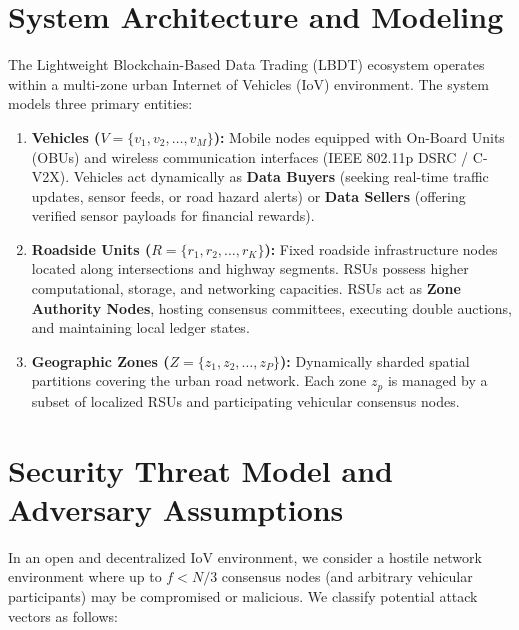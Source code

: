 \section{System Architecture and Modeling}\label{sec:problem_system_model}
\noindent The Lightweight Blockchain-Based Data Trading (LBDT) ecosystem operates within a multi-zone urban Internet of Vehicles (IoV) environment. The system models three primary entities:

\begin{enumerate}
    \item \textbf{Vehicles ($V = \{v_1, v_2, \dots, v_M\}$):} Mobile nodes equipped with On-Board Units (OBUs) and wireless communication interfaces (IEEE 802.11p DSRC / C-V2X). Vehicles act dynamically as \textbf{Data Buyers} (seeking real-time traffic updates, sensor feeds, or road hazard alerts) or \textbf{Data Sellers} (offering verified sensor payloads for financial rewards).
    \item \textbf{Roadside Units ($R = \{r_1, r_2, \dots, r_K\}$):} Fixed roadside infrastructure nodes located along intersections and highway segments. RSUs possess higher computational, storage, and networking capacities. RSUs act as \textbf{Zone Authority Nodes}, hosting consensus committees, executing double auctions, and maintaining local ledger states.
    \item \textbf{Geographic Zones ($Z = \{z_1, z_2, \dots, z_P\}$):} Dynamically sharded spatial partitions covering the urban road network. Each zone $z_p$ is managed by a subset of localized RSUs and participating vehicular consensus nodes.
\end{enumerate}

\section{Security Threat Model and Adversary Assumptions}\label{sec:problem_threat_model}
\noindent In an open and decentralized IoV environment, we consider a hostile network environment where up to $f < N/3$ consensus nodes (and arbitrary vehicular participants) may be compromised or malicious. We classify potential attack vectors as follows:

